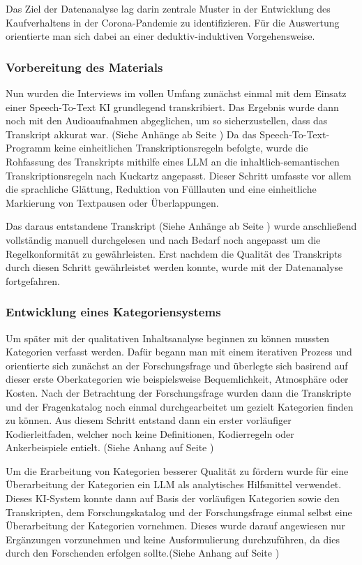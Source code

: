 Das Ziel der Datenanalyse lag darin zentrale Muster in der Entwicklung des Kaufverhaltens in der Corona-Pandemie zu identifizieren. Für die Auswertung orientierte man sich dabei an einer deduktiv-induktiven Vorgehensweise.

\subsubsection{Vorbereitung des Materials}
Nun wurden die Interviews im vollen Umfang zunächst einmal mit dem Einsatz einer Speech-To-Text KI grundlegend transkribiert. Das Ergebnis wurde dann noch mit den Audioaufnahmen abgeglichen, um so sicherzustellen, dass das Transkript akkurat war. (Siehe Anhänge ab Seite \pageref{app:roh1}) Da das Speech-To-Text-Programm keine einheitlichen Transkriptionsregeln befolgte, wurde die Rohfassung des Transkripts mithilfe eines \ac{LLM} an die inhaltlich-semantischen Transkriptionsregeln nach Kuckartz angepasst. Dieser Schritt umfasste vor allem die sprachliche Glättung, Reduktion von Fülllauten und eine einheitliche Markierung von Textpausen oder Überlappungen.

Das daraus entstandene Transkript (Siehe Anhänge ab Seite \pageref{app:kuckartz1}) wurde anschließend vollständig manuell durchgelesen und nach Bedarf noch angepasst um die Regelkonformität zu gewährleisten. Erst nachdem die Qualität des Transkripts durch diesen Schritt gewährleistet werden konnte, wurde mit der Datenanalyse fortgefahren.

\subsubsection{Entwicklung eines Kategoriensystems}
Um später mit der qualitativen Inhaltsanalyse beginnen zu können mussten Kategorien verfasst werden. Dafür begann man mit einem iterativen Prozess und orientierte sich zunächst an der Forschungsfrage und überlegte sich basirend auf dieser erste Oberkategorien wie beispielsweise Bequemlichkeit, Atmosphäre oder Kosten. Nach der Betrachtung der Forschungsfrage wurden dann die Transkripte und der Fragenkatalog noch einmal durchgearbeitet um gezielt Kategorien finden zu können. Aus diesem Schritt entstand dann ein erster vorläufiger Kodierleitfaden, welcher noch keine Definitionen, Kodierregeln oder Ankerbeispiele entielt. (Siehe Anhang auf Seite \pageref{app:kategorien1})

Um die Erarbeitung von Kategorien besserer Qualität zu fördern wurde für eine Überarbeitung der Kategorien ein \ac{LLM} als analytisches Hilfsmittel verwendet. Dieses KI-System konnte dann auf Basis der vorläufigen Kategorien sowie den Transkripten, dem Forschungskatalog und der Forschungsfrage einmal selbst eine Überarbeitung der Kategorien vornehmen. Dieses wurde darauf angewiesen nur Ergänzungen vorzunehmen und keine Ausformulierung durchzuführen, da dies durch den Forschenden erfolgen sollte.(Siehe Anhang auf Seite \pageref{app:kategorien2})

